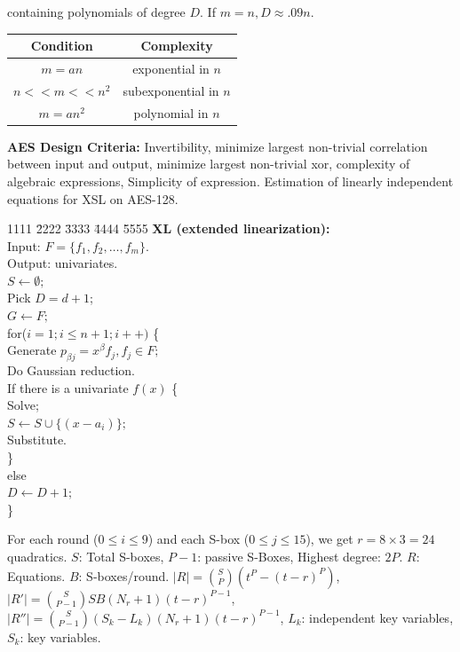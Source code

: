 containing polynomials of degree $D$.  If $m=n, D \approx .09n$.
\begin{center}
\begin{tabular} {|cc|}
\hline
Condition & Complexity \\
\hline
$m=an$ & exponential in $n$ \\
$n << m << n^2$ & subexponential in $n$ \\
$m=an^2$ & polynomial in $n$\\
\hline
\end{tabular}
\end{center}
{\bf AES Design Criteria:}
Invertibility,
minimize largest non-trivial correlation between input and output,
minimize largest non-trivial xor,
complexity of algebraic expressions,
Simplicity of expression.
Estimation of linearly independent equations for XSL on AES-128. 
\begin{tabbing}
1111 \= 2222 \= 3333 \= 4444 \= 5555 \kill
{\bf XL (extended linearization):}  \\
Input: $F= \{ f_1 , f_2 , \ldots , f_m \}$.\\
Output: univariates.\\
$S \leftarrow \emptyset;$\\
Pick $D=d+1$; \\
$G \leftarrow F;$\\
for($i=1; i \le n+1; i++)$ \{ \\
    \> Generate $p_{\beta j}= x^{\beta} f_j, f_j \in F;$ \\
    \> Do Gaussian reduction. \\
    \> If there is a univariate $f(x)$ \{ \\
    \>     \> Solve; \\
    \>     \> $S \leftarrow S \cup \{(x- a_i)\};$ \\
    \>     \> Substitute. \\
    \>     \> \} \\
    \> else \\
    \>     \> $D \leftarrow D + 1;$\\
    \> \} 
\end{tabbing}
For each round 
($0 \leq i \leq 9$)
and each
S-box ($0 \leq j \leq 15$), we get $r= 8 \times 3 =24$ quadratics. $S$: Total S-boxes,
$P-1$: passive S-Boxes, Highest degree: $2P$.  $R$: Equations.  $B$: S-boxes/round.
$|R|= {S \choose P} (t^P - (t-r)^P)$,
$|R'|= {S \choose {P-1}} SB (N_r +1) (t-r)^{P-1}$,
$|R''|= {S \choose {P-1}} (S_k -L_k) (N_r +1) (t-r)^{P-1}$, 
$L_k$: independent key variables, $S_k$: key variables.
